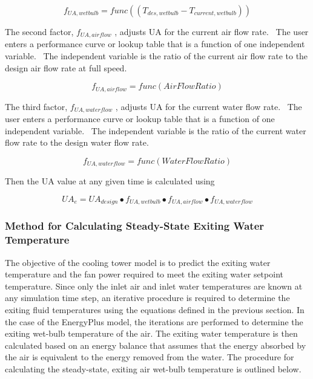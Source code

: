 \begin{equation}
{f_{UA,wetbulb}} = func\left( {\left( {{T_{des,wetbulb}} - {T_{current,wetbulb}}} \right)} \right)
\end{equation}

The second factor, \({f_{UA,airflow}}\) , adjusts UA for the current air flow rate.~ The user enters a performance curve or lookup table that is a function of one independent variable.~ The independent variable is the ratio of the current air flow rate to the design air flow rate at full speed.

\begin{equation}
{f_{UA,airflow}} = func\left( {AirFlowRatio} \right)
\end{equation}

The third factor, \({f_{UA,waterflow}}\) , adjusts UA for the current water flow rate.~ The user enters a performance curve or lookup table that is a function of one independent variable.~ The independent variable is the ratio of the current water flow rate to the design water flow rate.

\begin{equation}
{f_{UA,waterflow}} = func\left( {WaterFlowRatio} \right)
\end{equation}

Then the UA value at any given time is calculated using

\begin{equation}
U{A_e} = U{A_{design}} \bullet {f_{UA,wetbulb}} \bullet {f_{UA,airflow}} \bullet {f_{UA,waterflow}}
\end{equation}

\subsubsection{Method for Calculating Steady-State Exiting Water Temperature}\label{method-for-calculating-steady-state-exiting-water-temperature}

The objective of the cooling tower model is to predict the exiting water temperature and the fan power required to meet the exiting water setpoint temperature. Since only the inlet air and inlet water temperatures are known at any simulation time step, an iterative procedure is required to determine the exiting fluid temperatures using the equations defined in the previous section. In the case of the EnergyPlus model, the iterations are performed to determine the exiting wet-bulb temperature of the air. The exiting water temperature is then calculated based on an energy balance that assumes that the energy absorbed by the air is equivalent to the energy removed from the water. The procedure for calculating the steady-state, exiting air wet-bulb temperature is outlined below.

